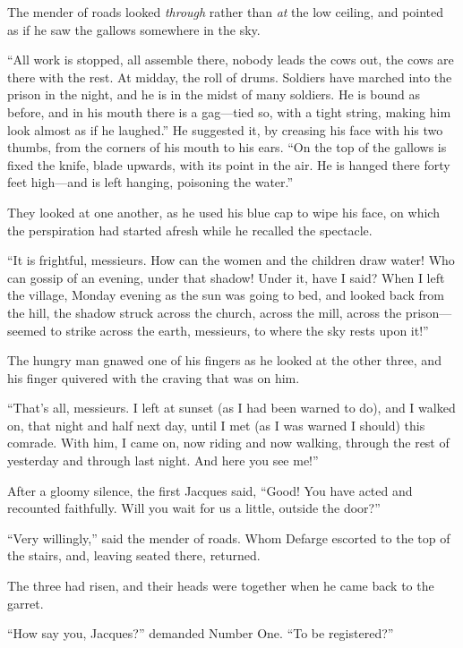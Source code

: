 The mender of roads looked \emph{through} rather than \emph{at} the low ceiling,
and pointed as if he saw the gallows somewhere in the sky.

``All work is stopped, all assemble there, nobody leads the cows out,
the cows are there with the rest.  At midday, the roll of drums.
Soldiers have marched into the prison in the night, and he is in the
midst of many soldiers.  He is bound as before, and in his mouth there
is a gag---tied so, with a tight string, making him look almost as if he
laughed.''  He suggested it, by creasing his face with his two thumbs,
from the corners of his mouth to his ears.  ``On the top of the gallows
is fixed the knife, blade upwards, with its point in the air.  He is
hanged there forty feet high---and is left hanging, poisoning the water.''

They looked at one another, as he used his blue cap to wipe his face,
on which the perspiration had started afresh while he recalled the spectacle.

``It is frightful, messieurs.  How can the women and the children draw
water!  Who can gossip of an evening, under that shadow!  Under it,
have I said?  When I left the village, Monday evening as the sun was
going to bed, and looked back from the hill, the shadow struck across
the church, across the mill, across the prison---seemed to strike across
the earth, messieurs, to where the sky rests upon it!''

The hungry man gnawed one of his fingers as he looked at the other
three, and his finger quivered with the craving that was on him.

``That's all, messieurs.  I left at sunset (as I had been warned to do),
and I walked on, that night and half next day, until I met (as I was
warned I should) this comrade.  With him, I came on, now riding and
now walking, through the rest of yesterday and through last night.
And here you see me!''

After a gloomy silence, the first Jacques said, ``Good!  You have
acted and recounted faithfully.  Will you wait for us a little,
outside the door?''

``Very willingly,'' said the mender of roads.  Whom Defarge escorted
to the top of the stairs, and, leaving seated there, returned.

The three had risen, and their heads were together when he came
back to the garret.

``How say you, Jacques?'' demanded Number One.  ``To be registered?''

